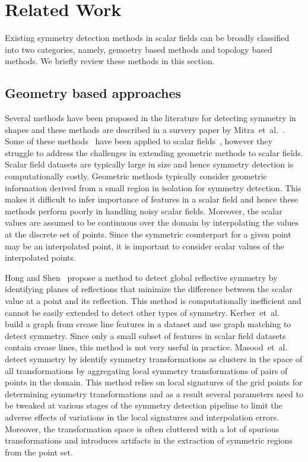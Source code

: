 \documentclass[review,journal]{vgtc}         %
\begin{document}
\section{Related Work}
Existing symmetry detection methods in scalar fields can be broadly classified into two
categories, namely, gemoetry based methods and topology based methods. We briefly review
these methods in this section.
\subsection{Geometry based approaches}
Several methods have been proposed in the literature for detecting
symmetry in shapes and these methods are described in a survery paper by
Mitra~et~al.~\cite{}. Some of these methods~\cite{} have been applied to scalar fields~\cite{},
however they struggle to address the challenges in extending geometric methods to scalar fields.
Scalar field datasets are typically large in size and hence symmetry detection is computationally costly.
Geometric methods typically consider geometric information derived from a small region in isolation 
for symmetry detection. This makes it difficult to infer importance of 
features in a scalar field and hence these methods perform poorly in handling noisy scalar fields.  
Moreover, the scalar values are assumed to be continuous over the domain by interpolating the values at 
the discrete set of points. Since the symmetric counterpart for a given point may be an interpolated 
point, it is important to consider scalar values of the interpolated points.

Hong and Shen~\cite{} propose a method to detect global reflective symmetry by identifying planes
of reflections that minimize the difference between the scalar value at a point and its
reflection. This method is computationally inefficient and cannot be easily extended to detect 
other types of symmetry. Kerber~et~al.~\cite{} build a graph from crease line features in a dataset
and use graph matching to detect symmetry. Since only a small subset of features in scalar field datasets
contain crease lines, this method is not very useful in practice. Masood~et~al.\cite{} detect
symmetry by identify symmetry transformations as clusters in the space of all transformations
by aggregating local symmetry transformations of pairs of points in the domain. This method relies
on local signatures of the grid points for determining symmetry transformations and as a result
several parameters need to be tweaked at various stages of the symmetry detection pipeline
to limit the adverse effects of variations in the local signatures and interpolation errors.  
Moreover, the transformation space is often cluttered with a lot of spurious transformations 
and introduces artifacts in the extraction of symmetric regions from the point set. 
\end{document}
